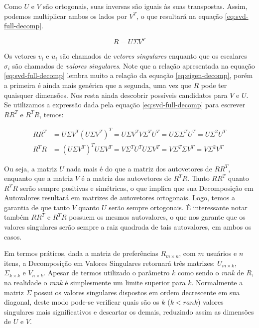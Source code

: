 Como $U$ e $V$ são ortogonais, suas inversas são iguais às suas transpostas. Assim, podemos multiplicar ambos os lados por $V^{T}$, o que resultará na equação \ref{eq:svd-full-decomp}.

\begin{equation}
R = U \Sigma V^{T}
\label{eq:svd-full-decomp}
\end{equation}

Os vetores $v_i$ e $u_i$ são chamados de \textit{vetores singulares} enquanto que os escalares $\sigma_i$ são chamados de \textit{valores singulares}. Note que a relação apresentada na equação \ref{eq:svd-full-decomp} lembra muito a relação da equação \ref{eq:eigen-decomp}, porém a primeira é ainda mais genérica que a segunda, uma vez que $R$ pode ter quaisquer dimensões. Nos resta ainda descobrir possíveis candidatos para $V$ e $U$. Se utilizamos a expressão dada pela equação \ref{eq:svd-full-decomp} para escrever $RR^{T}$ e $R^{T}R$, temos: 

\begin{align*}
RR^{T} &= U \Sigma V^{T}(U \Sigma V^{T})^{T} =  U \Sigma V^{T} V \Sigma^{T} U^{T} = U \Sigma \Sigma^{T} U^{T} = U \Sigma^2 U^{T} \\
R^{T}R &= (U \Sigma V^{T})^{T} U \Sigma V^{T} = V \Sigma^{T} U^{T} U \Sigma V^{T} = V \Sigma^{T} \Sigma V^{T} = V \Sigma^2 V^{T}
\end{align*}

Ou seja, a matriz $U$ nada mais é do que a matriz dos autovetores de $RR^{T}$, enquanto que a matriz $V$ é a matriz dos autovetores de $R^{T}R$. Tanto $RR^{T}$ quanto $R^{T}R$ serão sempre positivas e simétricas, o que implica que sua Decomposição em Autovalores resultará em matrizes de autovetores ortogonais. Logo, temos a garantia de que tanto $V$ quanto $U$ serão sempre ortogonais. É interessante notar também $RR^{T}$ e $R^{T}R$ possuem os mesmos autovalores, o que nos garante que os valores singulares serão sempre a raiz quadrada de tais autovalores, em ambos os casos.

Em termos práticos, dada a matriz de preferências $R_{m \times n}$, com $m$ usuários e $n$ itens, a Decomposição em Valores Singulares retornará três matrizes: $U_{m \times k}$, $\Sigma_{k \times k}$ e $V_{n \times k}$. Apesar de termos utilizado o parâmetro $k$ como sendo o \textit{rank} de $R$, na realidade o \textit{rank} é simplesmente um limite superior para $k$. Normalmente a matriz $\Sigma$ possui os valores singulares dispostos em ordem decrescente em sua diagonal, deste modo pode-se verificar quais são os $k$ ($k < rank$) valores singulares mais significativos e descartar os demais, reduzindo assim as dimensões de $U$ e $V$. 

